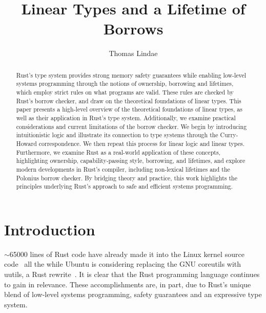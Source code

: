 \documentclass[sigplan,11pt,screen,nonacm]{acmart}
\begin{document}
\title{Linear Types and a Lifetime of Borrows}
\author{Thomas Lindae}


\begin{abstract}
  Rust's type system provides strong memory safety guarantees while enabling low-level systems programming through the notions of ownership, borrowing and lifetimes, which employ strict rules on what programs are valid. These rules are checked by Rust's borrow checker, and draw on the theoretical foundations of linear types. This paper presents a high-level overview of the theoretical foundations of linear types, as well as their application in Rust's type system. Additionally, we examine practical considerations and current limitations of the borrow checker. We begin by introducing intuitionistic logic and illustrate its connection to type systems through the Curry-Howard correspondence. We then repeat this process for linear logic and linear types. Furthermore, we examine Rust as a real-world application of these concepts, highlighting ownership, capability-passing style, borrowing, and lifetimes, and explore modern developments in Rust's compiler, including non-lexical lifetimes and the Polonius borrow checker. By bridging theory and practice, this work highlights the principles underlying Rust's approach to safe and efficient systems programming.
\end{abstract}

\maketitle

\sloppy

\section{Introduction} \label{sec:introduction}

\(\sim\)65000 lines of Rust code have already made it into the Linux kernel source code~\cite{intro:rust-in-linux} all the while Ubuntu is considering replacing the GNU coreutils with uutils, a Rust rewrite~\cite{intro:uutils, intro:ubuntu}. It is clear that the Rust programming language continues to gain in relevance. These accomplishments are, in part, due to Rust's unique blend of low-level systems programming, safety guarantees and an expressive type system.
\end{document}
